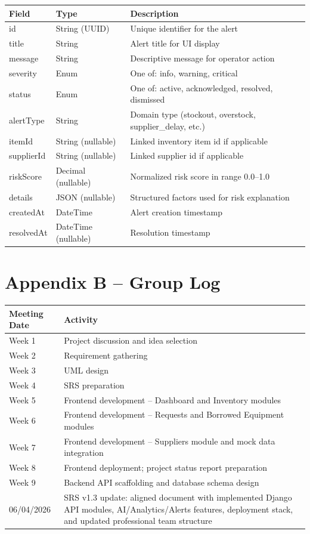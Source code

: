 \documentclass[12pt]{article}
\begin{document}
\begin{center}
\begin{tabular}{|l|l|p{7cm}|}
\hline
\textbf{Field} & \textbf{Type} & \textbf{Description} \\
\hline
id & String (UUID) & Unique identifier for the alert \\
title & String & Alert title for UI display \\
message & String & Descriptive message for operator action \\
severity & Enum & One of: info, warning, critical \\
status & Enum & One of: active, acknowledged, resolved, dismissed \\
alertType & String & Domain type (stockout, overstock, supplier\_delay, etc.) \\
itemId & String (nullable) & Linked inventory item id if applicable \\
supplierId & String (nullable) & Linked supplier id if applicable \\
riskScore & Decimal (nullable) & Normalized risk score in range 0.0--1.0 \\
details & JSON (nullable) & Structured factors used for risk explanation \\
createdAt & DateTime & Alert creation timestamp \\
resolvedAt & DateTime (nullable) & Resolution timestamp \\
\hline
\end{tabular}
\end{center}

\section*{Appendix B -- Group Log}

\begin{center}
\begin{tabular}{|l|p{11cm}|}
\hline
\textbf{Meeting Date} & \textbf{Activity} \\
\hline
Week 1 & Project discussion and idea selection \\
Week 2 & Requirement gathering \\
Week 3 & UML design \\
Week 4 & SRS preparation \\
Week 5 & Frontend development -- Dashboard and Inventory modules \\
Week 6 & Frontend development -- Requests and Borrowed Equipment modules \\
Week 7 & Frontend development -- Suppliers module and mock data integration \\
Week 8 & Frontend deployment; project status report preparation \\
Week 9 & Backend API scaffolding and database schema design \\
06/04/2026 & SRS v1.3 update: aligned document with implemented Django API modules, AI/Analytics/Alerts features, deployment stack, and updated professional team structure \\
\hline
\end{tabular}
\end{center}
\end{document}
